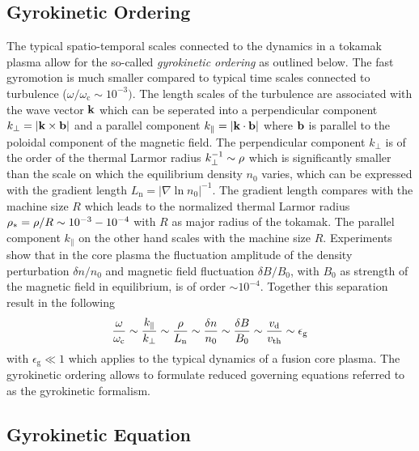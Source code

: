 \newpage

\subsection{Gyrokinetic Ordering}
\label{sub:gyroordering}

The typical spatio-temporal scales connected to the dynamics in a tokamak plasma allow for the so-called \textit{gyrokinetic ordering} as outlined below. The fast gyromotion is much smaller compared to typical  time scales connected to turbulence ($\omega/\omega_\mathrm{c} \sim 10^{-3})$. The length scales of the turbulence are associated with the wave vector $\boldsymbol{\mathbf{k}}$ which can be seperated into a perpendicular component $k_\perp = |\boldsymbol{\mathbf{k}} \times \boldsymbol{\mathbf{b}}|$ and a parallel component $k_\parallel = |\boldsymbol{\mathbf{k}} \cdot \boldsymbol{\mathbf{b}}|$ where $\boldsymbol{\mathbf{b}}$ is parallel to the poloidal component of the magnetic field. The perpendicular component $k_\perp$ is of the order of the thermal Larmor radius $k_\perp^{-1} \sim \rho$ which is significantly smaller than the scale on which the equilibrium density $n_0$ varies, which can be expressed with the gradient length $L_\mathrm{n} = |\nabla \ln n_0 |^{-1}$. The gradient length compares with the machine size $R$ which leads to the normalized thermal Larmor radius $\rho_* = \rho/R \sim 10^{-3} - 10^{-4}$ with $R$ as major radius of the tokamak. The parallel component $k_\parallel$ on the other hand scales with the machine size $R$. Experiments show that in the core plasma the fluctuation amplitude of the density perturbation $\delta n/n_0$ and magnetic field fluctuation $\delta B/B_0$, with $B_0$ as strength of the magnetic field in equilibrium, is of order $\sim 10^{-4}$. Together this separation result in the following
\begin{gather}
	\frac{\omega}{\omega_\mathrm{c}} \sim \frac{k_\parallel}{k_\perp} \sim \frac{\rho}{L_\mathrm{n}} \sim \frac{\delta n}{n_0} \sim \frac{\delta B}{B_0} \sim \frac{v_\mathrm{d}}{v_{\mathrm{th}}} \sim \epsilon_\mathrm{g}
	\label{eq:gyroordering}
\end{gather}
with $\epsilon_\mathrm{g} \ll 1$ which applies to the typical dynamics of a fusion core plasma. \cite{Brizard2007,Garbet2010} The gyrokinetic ordering allows to formulate reduced governing equations referred to as the gyrokinetic formalism.

\newpage

\subsection{Gyrokinetic Equation}
\label{sub:gyrokinetic}
 
